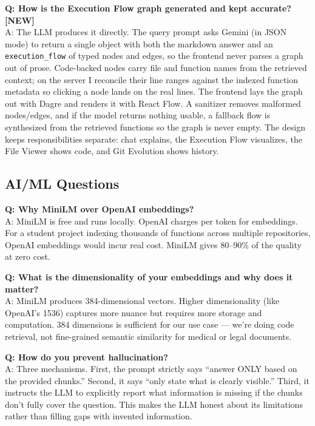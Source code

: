 \documentclass[a4paper,11pt]{article}
\begin{document}
\vspace{8pt}
\textbf{Q: How is the Execution Flow graph generated and kept accurate? \textbf{[NEW]}}\\[3pt]
A: The LLM produces it directly. The query prompt asks Gemini (in JSON mode) to return a single object with both the markdown answer and an \texttt{execution\_flow} of typed nodes and edges, so the frontend never parses a graph out of prose. Code-backed nodes carry file and function names from the retrieved context; on the server I reconcile their line ranges against the indexed function metadata so clicking a node lands on the real lines. The frontend lays the graph out with Dagre and renders it with React Flow. A sanitizer removes malformed nodes/edges, and if the model returns nothing usable, a fallback flow is synthesized from the retrieved functions so the graph is never empty. The design keeps responsibilities separate: chat explains, the Execution Flow visualizes, the File Viewer shows code, and Git Evolution shows history.

\subsection{AI/ML Questions}

\textbf{Q: Why MiniLM over OpenAI embeddings?}\\[3pt]
A: MiniLM is free and runs locally. OpenAI charges per token for embeddings. For a student project indexing thousands of functions across multiple repositories, OpenAI embeddings would incur real cost. MiniLM gives 80--90\% of the quality at zero cost.

\vspace{8pt}
\textbf{Q: What is the dimensionality of your embeddings and why does it matter?}\\[3pt]
A: MiniLM produces 384-dimensional vectors. Higher dimensionality (like OpenAI's 1536) captures more nuance but requires more storage and computation. 384 dimensions is sufficient for our use case --- we're doing code retrieval, not fine-grained semantic similarity for medical or legal documents.

\vspace{8pt}
\textbf{Q: How do you prevent hallucination?}\\[3pt]
A: Three mechanisms. First, the prompt strictly says ``answer ONLY based on the provided chunks.'' Second, it says ``only state what is clearly visible.'' Third, it instructs the LLM to explicitly report what information is missing if the chunks don't fully cover the question. This makes the LLM honest about its limitations rather than filling gaps with invented information.
\end{document}
